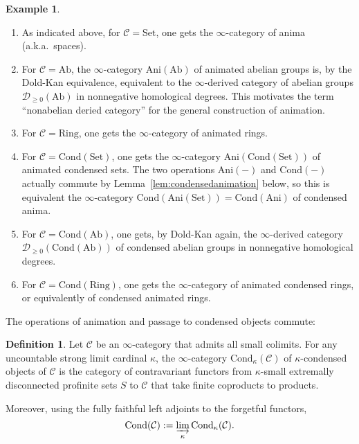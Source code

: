 \documentclass[11pt]{amsbook}
\DeclareMathOperator{\Cond}{Cond}
\numberwithin{equation}{section}
\numberwithin{theorem}{section}
\theoremstyle{definition}
\newtheorem{definition}[theorem]{Definition}
\newtheorem{example}[theorem]{Example}
\begin{document}
\begin{example}\leavevmode
\begin{enumerate}
\item As indicated above, for $\mathcal C=\mathrm{Set}$, one gets the $\infty$-category of anima (a.k.a.~spaces).
\item For $\mathcal C=\mathrm{Ab}$, the $\infty$-category $\mathrm{Ani}(\mathrm{Ab})$ of animated abelian groups is, by the Dold-Kan equivalence, equivalent to the $\infty$-derived category of abelian groups $\mathcal D_{\geq 0}(\mathrm{Ab})$ in nonnegative homological degrees. This motivates the term ``nonabelian deried category'' for the general construction of animation.
\item For $\mathcal C=\mathrm{Ring}$, one gets the $\infty$-category of animated rings.
\item For $\mathcal C=\mathrm{Cond}(\mathrm{Set})$, one gets the $\infty$-category $\mathrm{Ani}(\mathrm{Cond}(\mathrm{Set}))$ of animated condensed sets. The two operations $\mathrm{Ani}(-)$ and $\mathrm{Cond}(-)$ actually commute by Lemma~\ref{lem:condensedanimation} below, so this is equivalent the $\infty$-category $\mathrm{Cond}(\mathrm{Ani}(\mathrm{Set}))=\mathrm{Cond}(\mathrm{Ani})$ of condensed anima.
\item For $\mathcal C=\mathrm{Cond}(\mathrm{Ab})$, one gets, by Dold-Kan again, the $\infty$-derived category $\mathcal D_{\geq 0}(\mathrm{Cond}(\mathrm{Ab}))$ of condensed abelian groups in nonnegative homological degrees.
\item For $\mathcal C=\mathrm{Cond}(\mathrm{Ring})$, one gets the $\infty$-category of animated condensed rings, or equivalently of condensed animated rings.
\end{enumerate}
\end{example}

The operations of animation and passage to condensed objects commute:

\begin{definition} Let $\mathcal C$ be an $\infty$-category that admits all small colimits. For any uncountable strong limit cardinal $\kappa$, the $\infty$-category $\mathrm{Cond}_\kappa(\mathcal C)$ of $\kappa$-condensed objects of $\mathcal C$ is the category of contravariant functors from $\kappa$-small extremally disconnected profinite sets $S$ to $\mathcal C$ that take finite coproducts to products.

Moreover, using the fully faithful left adjoints to the forgetful functors,
\[
\Cond(\mathcal C):=\varinjlim_\kappa \mathrm{Cond}_\kappa(\mathcal C).
\]
\end{definition}
\end{document}
